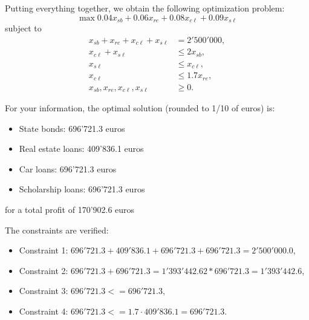 Putting everything together, we obtain the following optimization problem:
\[
\max 0.04 x_{sb} + 0.06 x_{re} + 0.08 x_{c\ell} + 0.09 x_{s\ell} 
\]
subject to
\begin{align*}
	x_{sb} + x_{re} + x_{c\ell} + x_{s\ell}  &= 2'500'000, \\
	x_{c\ell} + x_{s\ell}  &\leq 2x_{sb}, \\
	x_{s\ell}  &\leq x_{c\ell}, \\
	x_{c\ell} &\leq 1.7x_{re}, \\
	x_{sb}, x_{re}, x_{c\ell}, x_{s\ell} &\geq 0.
\end{align*}

For your information, the optimal solution (rounded to 1/10 of euros) is:
\begin{itemize}
\item State bonds: 696'721.3 euros
\item Real estate loans: 409'836.1 euros
\item Car loans: 696'721.3 euros
\item Scholarship loans: 696'721.3 euros
\end{itemize}
for a total profit of 170'902.6 euros

The constraints are verified:
\begin{itemize}
\item Constraint 1: $696'721.3 + 409'836.1 + 696'721.3 + 696'721.3 = 2'500'000.0$,
\item Constraint 2: $696'721.3 + 696'721.3 = 1'393'442.6  2 * 696'721.3 = 1'393'442.6$,
\item Constraint 3: $696'721.3 <= 696'721.3$,
\item Constraint 4: $696'721.3 <= 1.7 \cdot 409'836.1 = 696'721.3$.
\end{itemize}


